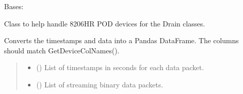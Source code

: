 \documentclass[letterpaper,10pt,english]{sphinxmanual}
\begin{document}
\begin{fulllineitems}
\label{\detokenize{PodApi.Stream.PodHandler:PodApi.Stream.PodHandler.Handle8206HR.Drain8206HR}}
\pysigstartsignatures
{}
\pysigstopsignatures
\sphinxAtStartPar
Bases: {\hyperref[\detokenize{PodApi.Stream.PodHandler:PodApi.Stream.PodHandler.HandlerInterface.DrainDeviceHandler}]{}}

\sphinxAtStartPar
Class to help handle 8206\sphinxhyphen{}HR POD devices for the Drain classes.

\begin{fulllineitems}
\label{\detokenize{PodApi.Stream.PodHandler:PodApi.Stream.PodHandler.Handle8206HR.Drain8206HR.DropToDf}}
\pysigstartsignatures
{}
\pysigstopsignatures
\sphinxAtStartPar
Converts the timestamps and data into a Pandas DataFrame. The columns should         match GetDeviceColNames().
\begin{quote}\begin{description}
\begin{itemize}
\item {} 
\sphinxAtStartPar
{} (\sphinxstyleliteralemphasis{\sphinxupquote{{[}}}\sphinxstyleliteralemphasis{\sphinxupquote{{]}}}) \textendash{} List of timestamps in seconds for each data packet.

\item {} 
\sphinxAtStartPar
{} (\sphinxstyleliteralemphasis{\sphinxupquote{{[}}}{\hyperref[\detokenize{PodApi.Packets:PodApi.Packets.Packet.Packet}]{\sphinxcrossref{\sphinxstyleliteralemphasis{\sphinxupquote{Packet}}}}}\sphinxstyleliteralemphasis{\sphinxupquote{ | }}\sphinxstyleliteralemphasis{\sphinxupquote{{]}}}) \textendash{} List of streaming binary data packets.


\end{itemize}
\end{description}
\end{quote}
\end{fulllineitems}
\end{fulllineitems}
\end{document}
